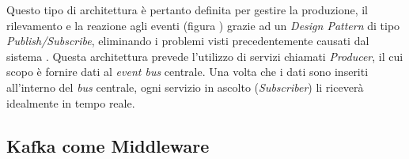 Questo tipo di architettura è pertanto definita per gestire la produzione, il rilevamento e la reazione agli eventi (figura \thefigure) grazie ad un \textit{Design Pattern} di tipo \textit{Publish/Subscribe}, eliminando i problemi visti precedentemente causati dal sistema .
Questa architettura prevede l'utilizzo di servizi chiamati \textit{Producer}, il cui scopo è fornire dati al \textit{event bus} centrale.
Una volta che i dati sono inseriti all'interno del \textit{bus} centrale, ogni servizio in ascolto (\textit{Subscriber}) li riceverà idealmente in tempo reale.
%
%
%
%


\subsection{Kafka come Middleware}

